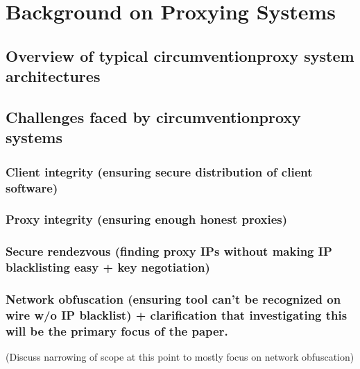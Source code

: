 %
\section{Background on Proxying Systems}
\label{section:proxying}

\subsection{Overview of typical circumventionproxy system architectures}

\subsection{Challenges faced by circumventionproxy systems}

\subsubsection{Client integrity (ensuring secure distribution of client software)}
\subsubsection{Proxy integrity (ensuring enough honest proxies)}
\subsubsection{Secure rendezvous (finding proxy IPs without making IP
blacklisting easy + key negotiation)}
\subsubsection{Network obfuscation (ensuring tool can’t be recognized on wire
w/o IP blacklist) + clarification that investigating this will be the primary
focus of the paper.}


(Discuss narrowing of scope at this point to mostly focus on network obfuscation)	

